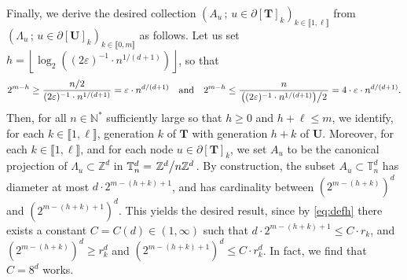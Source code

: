 \documentclass[a4paper,11pt]{article}
\begin{document}
Finally, we derive the desired collection $(A_u\,;\,u\in\partial[\mathbf{T}]_k)_{k\in\llbracket1,\ell\rrbracket}$ from ${(\Lambda_u\,;\,u\in\partial[\mathbf{U}]_k)_{k\in\llbracket0,m\rrbracket}}$ as follows.
Let us set $h=\left\lfloor\log_2\left((2\varepsilon)^{-1}\cdot n^{1/(d+1)}\right)\right\rfloor$, so that
\begin{equation}\label{eq:defh}
2^{m-h}\geq\frac{n/2}{(2\varepsilon)^{-1}\cdot n^{1/(d+1)}}=\varepsilon\cdot n^{d/(d+1)}\quad\text{and}\quad2^{m-h}\leq\frac{n}{\left.\left((2\varepsilon)^{-1}\cdot n^{1/(d+1)}\right)\middle/2\right.}=4\cdot\varepsilon\cdot n^{d/(d+1)}.
\end{equation}
Then, for all $n\in\mathbb{N}^*$ sufficiently large so that $h\geq0$ and $h+\ell\leq m$, we identify, for each $k\in\llbracket1,\ell\rrbracket$, generation $k$ of $\mathbf{T}$ with generation $h+k$ of $\mathbf{U}$.
Moreover, for each $k\in\llbracket1,\ell\rrbracket$, and for each node $u\in\partial[\mathbf{T}]_k$, we set $A_u$ to be the canonical projection of $\Lambda_u\subset\mathbb{Z}^d$ in $\mathbb{T}_n^d=\left.\mathbb{Z}^d\middle/n\mathbb{Z}^d\right.$.
By construction, the subset $A_u\subset\mathbb{T}_n^d$ has diameter at most $d\cdot2^{m-(h+k)+1}$, and has cardinality between $\left(2^{m-(h+k)}\right)^d$ and $\left(2^{m-(h+k)+1}\right)^d$.
This yields the desired result, since by \eqref{eq:defh} there exists a constant $C=C(d)\in(1,\infty)$ such that $d\cdot2^{m-(h+k)+1}\leq C\cdot r_k$, and $\left(2^{m-(h+k)}\right)^d\geq r_k^d$ and $\left(2^{m-(h+k)+1}\right)^d\leq C\cdot r_k^d$.
In fact, we find that $C=8^d$ works.
\end{document}
